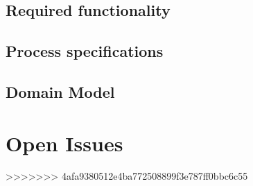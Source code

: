 \documentclass[12pt, oneside]{book}
\begin{document}
\subsection{Required functionality}
\subsection{Process specifications}
\subsection{Domain Model}
\section{Open Issues}

>>>>>>> 4afa9380512e4ba772508899f3e787ff0bbc6c55
\end{document}
